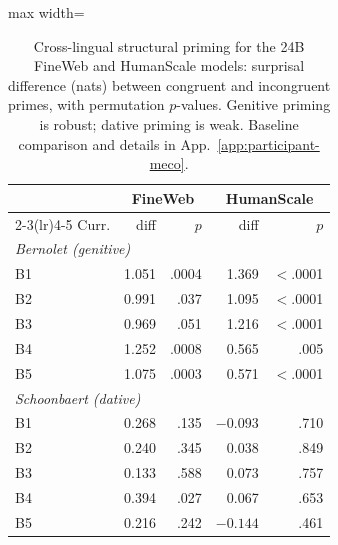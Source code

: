 \begin{table}[t]
\centering
\small
\setlength{\tabcolsep}{4pt}
\begin{adjustbox}{max width=\columnwidth}
\begin{tabular}{lrrrr}
\toprule
 & \multicolumn{2}{c}{FineWeb} & \multicolumn{2}{c}{HumanScale} \\
\cmidrule(lr){2-3}\cmidrule(lr){4-5}
Curr. & diff & $p$ & diff & $p$ \\
\midrule
\multicolumn{5}{l}{\textit{Bernolet (genitive)}} \\
B1 & 1.051 & .0004 & 1.369 & $<$.0001 \\
B2 & 0.991 & .037  & 1.095 & $<$.0001 \\
B3 & 0.969 & .051  & 1.216 & $<$.0001 \\
B4 & 1.252 & .0008 & 0.565 & .005 \\
B5 & 1.075 & .0003 & 0.571 & $<$.0001 \\
\midrule
\multicolumn{5}{l}{\textit{Schoonbaert (dative)}} \\
B1 & 0.268 & .135 & $-0.093$ & .710 \\
B2 & 0.240 & .345 & 0.038   & .849 \\
B3 & 0.133 & .588 & 0.073   & .757 \\
B4 & 0.394 & .027 & 0.067   & .653 \\
B5 & 0.216 & .242 & $-0.144$ & .461 \\
\bottomrule
\end{tabular}
\end{adjustbox}
\caption{Cross-lingual structural priming for the 24B FineWeb and HumanScale models: surprisal difference (nats) between congruent and incongruent primes, with permutation $p$-values. Genitive priming is robust; dative priming is weak. Baseline comparison and details in App.~\ref{app:participant-meco}.}
\label{tab:beetle-priming}
\end{table}
